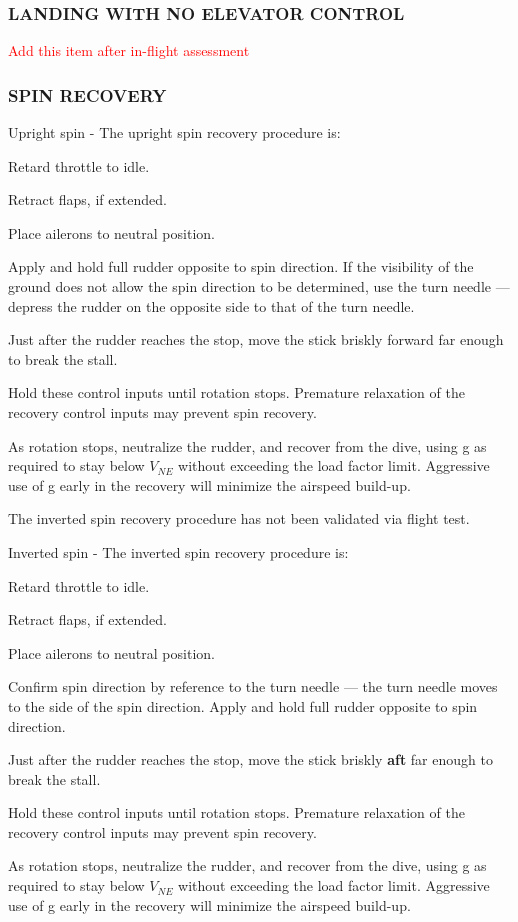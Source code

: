 \subsubsection{LANDING WITH NO ELEVATOR CONTROL}
\textcolor{red}{Add this item after in-flight assessment}

\subsubsection{SPIN RECOVERY}

Upright spin - The upright spin recovery procedure is:
\begin{enumerate*}
  \item Retard throttle to idle.
  \item Retract flaps, if extended.
  \item Place ailerons to neutral position.
  \item Apply and hold full rudder opposite to spin direction.  If the visibility of the ground does not allow the spin direction to be determined, use the turn needle --- depress the rudder on the opposite side to that of the turn needle.
  \item Just after the rudder reaches the stop, move the stick briskly forward far enough to break the stall.
  \item Hold these control inputs until rotation stops.  Premature relaxation of the recovery control inputs may prevent spin recovery.
  \item As rotation stops, neutralize the rudder, and recover from the dive, using g as required to stay below $V_{NE}$ without exceeding the load factor limit.  Aggressive use of g early in the recovery will minimize the airspeed build-up.
  \end{enumerate*}
  
\begin{Note}
The inverted spin recovery procedure has not been validated via flight test.
\end{Note}

Inverted spin - The inverted spin recovery procedure is:
\begin{enumerate*}
  \item Retard throttle to idle.
  \item Retract flaps, if extended.
  \item Place ailerons to neutral position.
  \item Confirm spin direction by reference to the turn needle --- the turn needle moves to the side of the spin direction.  Apply and hold full rudder opposite to spin direction.  
  \item Just after the rudder reaches the stop, move the stick briskly \textbf{aft} far enough to break the stall.
  \item Hold these control inputs until rotation stops.  Premature relaxation of the recovery control inputs may prevent spin recovery.
  \item As rotation stops, neutralize the rudder, and recover from the dive, using g as required to stay below $V_{NE}$ without exceeding the load factor limit.  Aggressive use of g early in the recovery will minimize the airspeed build-up.
  \end{enumerate*}
